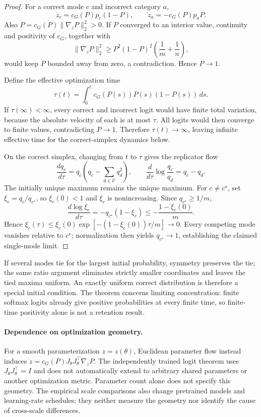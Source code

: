 \begin{proof}
For a correct mode $c$ and incorrect category $a$,
\[
  \dot z_c=c_G(P)p_c(1-P),
  \qquad
  \dot z_a=-c_G(P)p_aP.
\]
Also $\dot P=c_G(P)\lVert\nabla_zP\rVert_2^2>0$. If $P$ converged to an
interior value, continuity and positivity of $c_G$, together with
\[
 \lVert\nabla_zP\rVert_2^2
 \ge P^2(1-P)^2\left(\frac1m+\frac1n\right),
\]
would keep $\dot P$ bounded away from zero, a contradiction. Hence $P\to1$.

Define the effective optimization time
\[
  \tau(t)=\int_0^t c_G(P(s))P(s)(1-P(s))\,ds.
\]
If $\tau(\infty)<\infty$, every correct and incorrect logit would have finite
total variation, because the absolute velocity of each is at most $\dot\tau$.
All logits would then converge to finite values, contradicting $P\to1$.
Therefore $\tau(t)\to\infty$, leaving infinite effective time for the
correct-simplex dynamics below.

On the correct simplex, changing from $t$ to $\tau$ gives the replicator flow
\begin{equation}
  \frac{dq_c}{d\tau}
  =q_c\left(q_c-\sum_{d\in\mathcal C}q_d^2\right),
  \qquad
  \frac{d}{d\tau}\log\frac{q_c}{q_d}=q_c-q_d.
  \label{eq:grpo-replicator}
\end{equation}
The initially unique maximum remains the unique maximum. For $c\ne c^\star$,
set $\xi_c=q_c/q_{c^\star}$, so $\xi_c(0)<1$ and $\xi_c$ is nonincreasing.
Since $q_{c^\star}\ge1/m$,
\[
 \frac{d\log\xi_c}{d\tau}
 =-q_{c^\star}(1-\xi_c)
 \le-\frac{1-\xi_c(0)}{m}.
\]
Hence $\xi_c(\tau)\le\xi_c(0)\exp[-(1-\xi_c(0))\tau/m]\to0$.
Every competing mode vanishes relative to $c^\star$; normalization then
yields $q_{c^\star}\to1$, establishing the claimed single-mode limit.
\end{proof}

If several modes tie for the largest initial probability, symmetry preserves
the tie; the same ratio argument eliminates strictly smaller coordinates and
leaves the tied maxima uniform. An exactly uniform correct distribution is
therefore a special initial condition. The theorem concerns limiting
concentration: finite softmax logits already give positive probabilities at
every finite time, so finite-time positivity alone is not a retention result.

\paragraph{Dependence on optimization geometry.}
For a smooth parameterization $z=z(\theta)$, Euclidean parameter flow instead
induces $\dot z=c_G(P)J_\theta J_\theta^\top\nabla_zP$. The independently
trained logit theorem uses $J_\theta J_\theta^\top=I$ and does not automatically
extend to arbitrary shared parameters or another optimization metric.
Parameter count alone does not specify this geometry. The empirical scale
comparisons also change pretrained models and learning-rate schedules; they
neither measure the geometry nor identify the cause of cross-scale differences.

